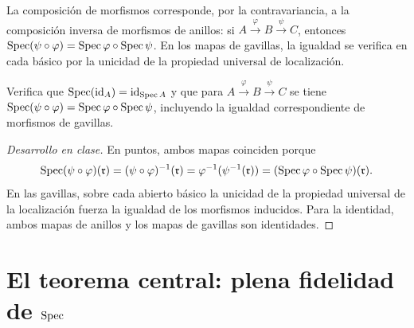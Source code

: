 La composición de morfismos corresponde, por la contravariancia, a la composición inversa de morfismos de anillos: si $A\xrightarrow{\varphi}B\xrightarrow{\psi}C$, entonces $\operatorname{Spec}(\psi\circ\varphi)=\operatorname{Spec}\varphi\circ\operatorname{Spec}\psi$. En los mapas de gavillas, la igualdad se verifica en cada básico por la unicidad de la propiedad universal de localización.

\begin{ejer}[Funtorialidad]
\label{ejer:s06-funtorialidad}
Verifica que $\operatorname{Spec}(\operatorname{id}_A)=\operatorname{id}_{\operatorname{Spec} A}$ y que para $A\xrightarrow{\varphi}B\xrightarrow{\psi}C$ se tiene $\operatorname{Spec}(\psi\circ\varphi)=\operatorname{Spec}\varphi\circ\operatorname{Spec}\psi$, incluyendo la igualdad correspondiente de morfismos de gavillas.
\end{ejer}
\begin{proof}[Desarrollo en clase]
En puntos, ambos mapas coinciden porque
\[
\operatorname{Spec}(\psi\circ\varphi)(\mathfrak r)=(\psi\circ\varphi)^{-1}(\mathfrak r)=\varphi^{-1}(\psi^{-1}(\mathfrak r))=(\operatorname{Spec}\varphi\circ\operatorname{Spec}\psi)(\mathfrak r).
\]
En las gavillas, sobre cada abierto básico la unicidad de la propiedad universal de la localización fuerza la igualdad de los morfismos inducidos. Para la identidad, ambos mapas de anillos y los mapas de gavillas son identidades.
\end{proof}

\section{El teorema central: plena fidelidad de \texorpdfstring{$\operatorname{Spec}$}{Spec}}
\label{sec:s06-plena-fidelidad}

